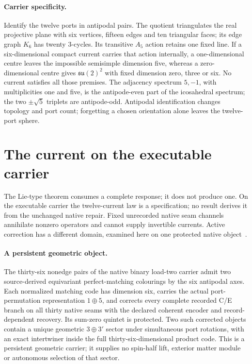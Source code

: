 \documentclass[11pt]{article}
\begin{document}
\paragraph{Carrier specificity.}
Identify the twelve ports in antipodal pairs. The quotient triangulates the
real projective plane with six vertices, fifteen edges and ten triangular
faces; its edge graph \(K_6\) has twenty \(3\)-cycles. Its transitive
\(A_5\) action retains one fixed line. If a six-dimensional compact current
carries that action internally, a one-dimensional centre leaves the
impossible semisimple dimension five, whereas a zero-dimensional centre gives
\(\mathfrak{su}(2)^2\) with fixed dimension zero, three or six. No current
satisfies all those premises. The adjacency spectrum \(5,-1\), with
multiplicities one and five, is the antipode-even part of the icosahedral
spectrum; the two \(\pm\sqrt5\) triplets are antipode-odd. Antipodal
identification changes topology and port count; forgetting a chosen
orientation alone leaves the twelve-port sphere.

\section{The current on the executable carrier}
\label{sec:executable-current}

The Lie-type theorem consumes a complete response; it does not produce one.
On the executable carrier the twelve-current law is a specification; no
result derives it from the unchanged native repair. Fixed unrecorded native seam
channels annihilate nonzero operators and cannot supply invertible currents.
Active correction has a different domain, examined here on one protected
native object~\cite{ophmodel,ophrepo}.

\paragraph{A persistent geometric object.}
The thirty-six nonedge pairs of the native binary load-two carrier admit two
source-derived equivariant perfect-matching colourings by the six antipodal
axes. Each normalized matching code has dimension six, carries the actual
port-permutation representation \(1\oplus5\), and corrects every complete
recorded C/E branch on all thirty native seams with the declared coherent
encoder and record-dependent recovery. Its sum-zero quintet is protected. Two
such corrected objects contain a unique geometric \(3\oplus3'\) sector under
simultaneous port rotations, with an exact intertwiner inside the full
thirty-six-dimensional product code. This is a persistent geometric carrier;
it supplies no spin-half lift, exterior matter module or autonomous selection
of that sector.
\end{document}
